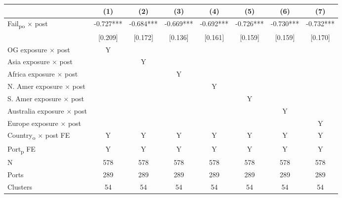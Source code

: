 {
\def\sym#1{\ifmmode^{#1}\else\(^{#1}\)\fi}
\begin{tabular}{l*{7}{c}}
\toprule
            &\multicolumn{1}{c}{(1)}   &\multicolumn{1}{c}{(2)}   &\multicolumn{1}{c}{(3)}   &\multicolumn{1}{c}{(4)}   &\multicolumn{1}{c}{(5)}   &\multicolumn{1}{c}{(6)}   &\multicolumn{1}{c}{(7)}   \\
\midrule
Fail\textsubscript{po} $\times$ post&      -0.727***&      -0.684***&      -0.669***&      -0.692***&      -0.726***&      -0.730***&      -0.732***\\
            &     [0.209]   &     [0.172]   &     [0.136]   &     [0.161]   &     [0.159]   &     [0.159]   &     [0.170]   \\
OG exposure $\times$ post &           Y   &               &               &               &               &               &               \\
Asia exposure $\times$ post&               &           Y   &               &               &               &               &               \\
Africa exposure $\times$ post&               &               &           Y   &               &               &               &               \\
N. Amer exposure $\times$ post&               &               &               &           Y   &               &               &               \\
S. Amer exposure $\times$ post&               &               &               &               &           Y   &               &               \\
Australia exposure $\times$ post&               &               &               &               &               &           Y   &               \\
Europe exposure $\times$ post&               &               &               &               &               &               &           Y   \\
Country\textsubscript{o} $\times$ post FE&           Y   &           Y   &           Y   &           Y   &           Y   &           Y   &           Y   \\
Port\textsubscript{p} FE &           Y   &           Y   &           Y   &           Y   &           Y   &           Y   &           Y   \\
\midrule
N           &         578   &         578   &         578   &         578   &         578   &         578   &         578   \\
Ports       &         289   &         289   &         289   &         289   &         289   &         289   &         289   \\
Clusters    &          54   &          54   &          54   &          54   &          54   &          54   &          54   \\
\bottomrule
\end{tabular}
}
